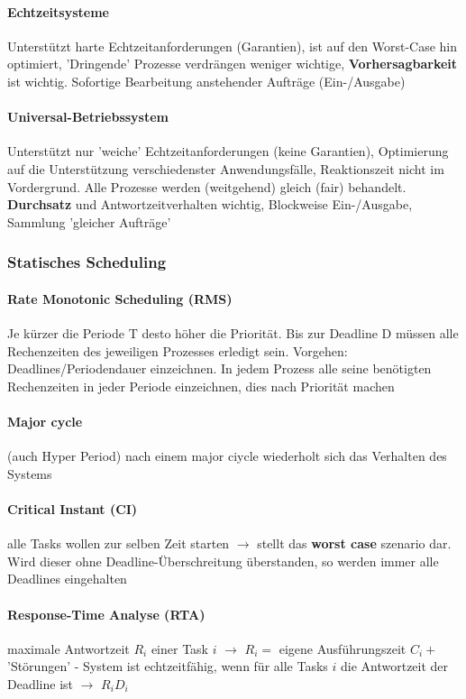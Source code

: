 \documentclass[10pt,a4paper,landscape]{article}
\begin{document}
\begin{multicols*}{3}
	\paragraph{Echtzeitsysteme} Unterstützt harte Echtzeitanforderungen (Garantien), ist auf den Worst-Case hin optimiert, 'Dringende' Prozesse verdrängen weniger wichtige, \textbf{Vorhersagbarkeit} ist wichtig. Sofortige Bearbeitung anstehender Aufträge (Ein-/Ausgabe)
	\paragraph{Universal-Betriebssystem} Unterstützt nur 'weiche' Echtzeitanforderungen (keine Garantien), Optimierung auf die Unterstützung verschiedenster Anwendungsfälle, Reaktionszeit nicht im Vordergrund. Alle Prozesse werden (weitgehend) gleich (fair) behandelt. \textbf{Durchsatz} und Antwortzeitverhalten wichtig, Blockweise Ein-/Ausgabe, Sammlung 'gleicher Aufträge'
	\subsubsection{Statisches Scheduling}
	\paragraph{Rate Monotonic Scheduling (RMS)} Je kürzer die Periode T desto höher die Priorität. Bis zur Deadline D müssen alle Rechenzeiten des jeweiligen Prozesses erledigt sein. Vorgehen: Deadlines/Periodendauer einzeichnen. In jedem Prozess alle seine benötigten Rechenzeiten in jeder Periode einzeichnen, dies nach Priorität machen
	\paragraph{Major cycle} (auch Hyper Period) nach einem major ciycle wiederholt sich das Verhalten des Systems
	\paragraph{Critical Instant (CI)} alle Tasks wollen zur selben Zeit starten $\rightarrow$ stellt das \textbf{worst case} szenario dar. Wird dieser ohne Deadline-Überschreitung überstanden, so werden immer alle Deadlines eingehalten
	\paragraph{Response-Time Analyse (RTA)} maximale Antwortzeit $R_i$ einer Task $i$ $\rightarrow$ $R_i =$ eigene Ausführungszeit $C_i +$ 'Störungen' - System ist echtzeitfähig, wenn für alle Tasks $i$ die Antwortzeit der Deadline ist $\rightarrow$ $R_i D_i$

\end{multicols*}
\end{document}
